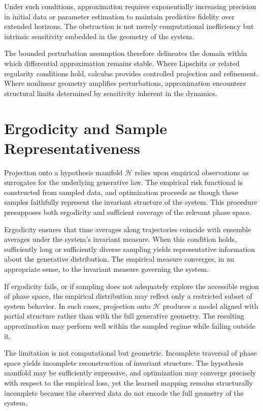 \documentclass[12pt]{book}
\begin{document}
Under such conditions, approximation requires exponentially increasing precision in initial data or parameter estimation to maintain predictive fidelity over extended horizons. The obstruction is not merely computational inefficiency but intrinsic sensitivity embedded in the geometry of the system.

The bounded perturbation assumption therefore delineates the domain within which differential approximation remains stable. Where Lipschitz or related regularity conditions hold, calculus provides controlled projection and refinement. Where nonlinear geometry amplifies perturbations, approximation encounters structural limits determined by sensitivity inherent in the dynamics.

\section{Ergodicity and Sample Representativeness}

Projection onto a hypothesis manifold $\mathcal{H}$ relies upon empirical observations as surrogates for the underlying generative law. The empirical risk functional is constructed from sampled data, and optimization proceeds as though these samples faithfully represent the invariant structure of the system. This procedure presupposes both ergodicity and sufficient coverage of the relevant phase space.

Ergodicity ensures that time averages along trajectories coincide with ensemble averages under the system's invariant measure. When this condition holds, sufficiently long or sufficiently diverse sampling yields representative information about the generative distribution. The empirical measure converges, in an appropriate sense, to the invariant measure governing the system.

If ergodicity fails, or if sampling does not adequately explore the accessible region of phase space, the empirical distribution may reflect only a restricted subset of system behavior. In such cases, projection onto $\mathcal{H}$ produces a model aligned with partial structure rather than with the full generative geometry. The resulting approximation may perform well within the sampled regime while failing outside it.

The limitation is not computational but geometric. Incomplete traversal of phase space yields incomplete reconstruction of invariant structure. The hypothesis manifold may be sufficiently expressive, and optimization may converge precisely with respect to the empirical loss, yet the learned mapping remains structurally incomplete because the observed data do not encode the full geometry of the system.
\end{document}
